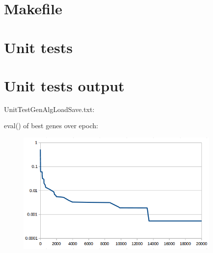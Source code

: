 \section{Makefile}

\begin{scriptsize}
\begin{ttfamily}

\end{ttfamily}
\end{scriptsize}

\section{Unit tests}

\begin{scriptsize}
\begin{ttfamily}

\end{ttfamily}
\end{scriptsize}

\section{Unit tests output}

\begin{scriptsize}
\begin{ttfamily}

\end{ttfamily}
\end{scriptsize}

UnitTestGenAlgLoadSave.txt:\\
\begin{scriptsize}
\begin{ttfamily}

\end{ttfamily}
\end{scriptsize}

eval() of best genes over epoch:\\
\begin{center}
\begin{figure}[H]
\centering\includegraphics[width=10cm]{./eval.png}\\
\end{figure}
\end{center}

